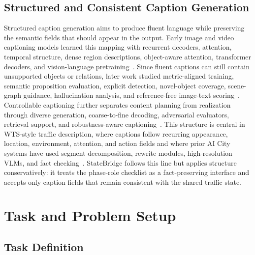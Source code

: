 \documentclass[runningheads]{llncs}
\begin{document}
\subsection{Structured and Consistent Caption Generation}
Structured caption generation aims to produce fluent language while preserving the semantic fields that should appear in the output. Early image and video captioning models learned this mapping with recurrent decoders, attention, temporal structure, dense region descriptions, object-aware attention, transformer decoders, and vision-language pretraining~\cite{vinyals2015showandtell,xu2015showattend,venugopalan2015s2vt,yao2015temporal,johnson2016densecap,anderson2018bottomup,huang2019aoa,cornia2020m2,li2020oscar,zhang2021vinvl,li2022blip,li2023blip2,dai2023instructblip,sun2019videobert,luo2020univl}. Since fluent captions can still contain unsupported objects or relations, later work studied metric-aligned training, semantic proposition evaluation, explicit detection, novel-object coverage, scene-graph guidance, hallucination analysis, and reference-free image-text scoring~\cite{papineni2002bleu,banerjee2005meteor,lin2004rouge,vedantam2015cider,anderson2016spice,rennie2017selfcritical,lu2018neuralbaby,wang2018objectcounts,agrawal2019nocaps,li2019pointing,yang2019sgae,wang2019scenegraphs,rohrbach2018hallucination,hessel2021clipscore}. Controllable captioning further separates content planning from realization through diverse generation, coarse-to-fine decoding, adversarial evaluators, retrieval support, and robustness-aware captioning~\cite{dai2017diverse,gu2018stackcaptioning,chen2019cgan,li2024evcap,li2024retrievalrobustness}. This structure is central in WTS-style traffic description, where captions follow recurring appearance, location, environment, attention, and action fields and where prior AI City systems have used segment decomposition, rewrite modules, high-resolution VLMs, and fact checking~\cite{xuan2024divide,pervaiz2025trafficvila,park2025trafficvila,phimsiri2025trafficinternvl}. StateBridge follows this line but applies structure conservatively: it treats the phase-role checklist as a fact-preserving interface and accepts only caption fields that remain consistent with the shared traffic state.

\section{Task and Problem Setup}

\subsection{Task Definition}
\end{document}
